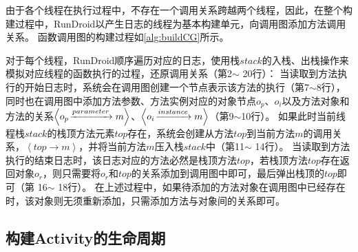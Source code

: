 
由于各个线程在执行过程中，不存在一个调用关系跨越两个线程，因此，在整个构建过程中，RunDroid以产生日志的线程为基本构建单元，向调用图添加方法调用关系。
函数调用图的构建过程如\autoref{alg:buildCG}所示。

对于每个线程，RunDroid顺序遍历对应的日志，使用栈$stack$的入栈、出栈操作来模拟对应线程的函数执行的过程，还原调用关系（第2$\sim$ 20行）：
当读取到方法执行的开始日志时，系统会在调用图创建一个节点表示该方法的执行（第7$\sim$8行），
同时也在调用图中添加方法参数、方法实例对应的对象节点$o_p$、$o_i$以及方法对象和方法的关系$ \left\langle  o_p \joinrel\xrightarrow{parameter}   m \right\rangle   $、$ \left\langle   o_i \joinrel\xrightarrow{instance}   m \right\rangle  $（第9$\sim$10行）。
如果此时当前线程栈$stack$的栈顶方法元素$top$存在，系统会创建从方法$top$到当前方法$m$的调用关系，$\left\langle top \to m \right \rangle  $，并将当前方法$m$压入栈$stack$中（第11$\sim$ 14行）。
当读取到方法执行的结束日志时，该日志对应的方法必然是栈顶方法$top$，若栈顶方法$top$存在返回对象$o_r$，则只需要将$o_r$和$top$的关系添加到调用图中即可，最后弹出栈顶的$top$即可（第 16$\sim$ 18行）。
在上述过程中，如果待添加的方法对象在调用图中已经存在时，该对象则无须重新添加，只需添加方法与对象间的关系即可。








\subsection{构建Activity的生命周期}

